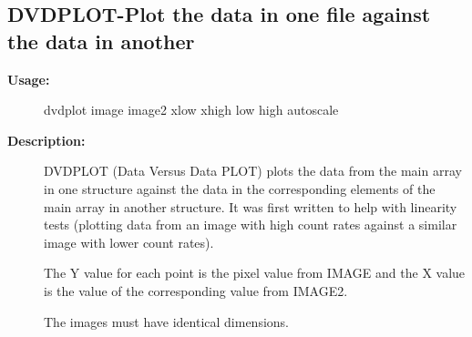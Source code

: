 \subsection{DVDPLOT-\label{DVDPLOT}Plot the data in one file against the data in another}
\begin{description}

\item [{\bf Usage:}]
 dvdplot image image2 xlow xhigh low high autoscale

\item [{\bf Description:}]
 DVDPLOT (Data Versus Data PLOT) plots the data from the main
 array in one structure against the data in the corresponding
 elements of the main array in another structure.  It was first
 written to help with linearity tests (plotting data from an
 image with high count rates against a similar image with lower
 count rates).

 The Y value for each point is the pixel value from IMAGE and
 the X value is the value of the corresponding value from
 IMAGE2.

 The images must have identical dimensions.


\end{description}
